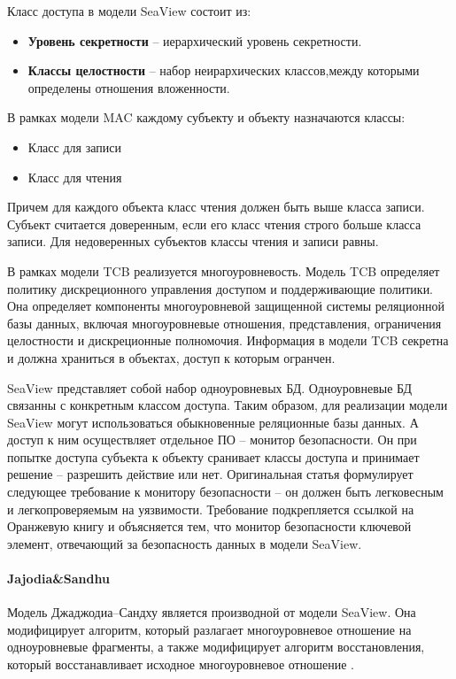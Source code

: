 Класс доступа в модели SeaView состоит из:

\begin{itemize}
    \item \textbf{Уровень секретности} -- иерархический уровень секретности.
    \item \textbf{Классы целостности} -- набор неирархических классов,между которыми определены отношения вложенности.
\end{itemize}

В рамках модели MAC каждому субъекту и объекту назначаются классы:

\begin{itemize}
    \item Класс для записи
    \item Класс для чтения
\end{itemize}

Причем для каждого объекта класс чтения должен быть выше класса записи. Субъект считается доверенным, если его класс чтения строго больше класса записи. Для недоверенных субъектов классы чтения и записи равны.

В рамках модели TCB реализуется многоуровневость.  Модель TCB определяет политику дискреционного управления доступом и поддерживающие политики. Она определяет компоненты многоуровневой защищенной системы реляционной базы данных, включая многоуровневые отношения, представления, ограничения целостности и дискреционные полномочия. Информация в модели TCB секретна и должна храниться в объектах, доступ к которым огранчен. 

SeaView представляет собой набор одноуровневых БД.  Одноуровневые БД связанны с конкретным классом доступа. Таким образом, для реализации модели SeaView могут использоваться обыкновенные реляционные базы данных. А доступ к ним осуществляет отдельное ПО -- монитор безопасности.  Он при попытке доступа субъекта к объекту сранивает классы доступа и принимает решение -- разрешить действие или нет. Оригинальная статья формулирует следующее требование к монитору безопасности -- он должен быть легковесным и легкопроверяемым на уязвимости. Требование подкрепляется ссылкой на Оранжевую книгу и объясняется тем, что монитор безопасности ключевой элемент, отвечающий за безопасность данных в модели SeaView.

\paragraph{Jajodia\&Sandhu}

Модель Джаджодиа–Сандху является производной от модели SeaView. Она модифицирует алгоритм, который разлагает 
многоуровневое отношение на одноуровневые фрагменты, а также модифицирует алгоритм восстановления, который 
восстанавливает исходное многоуровневое отношение \autocite{Osama}.

